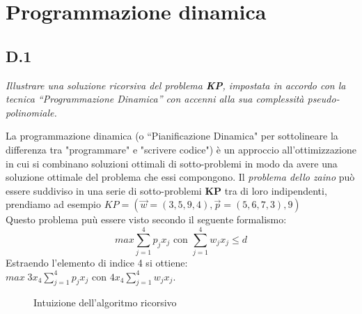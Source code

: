 \documentclass[a4paper]{article}
\begin{document}
\section{Programmazione dinamica}
\subsection{D.1}
\emph{Illustrare una soluzione ricorsiva del problema \textbf{KP}, impostata in accordo con la tecnica “Programmazione Dinamica” con accenni alla sua complessità pseudo-polinomiale.}

La programmazione dinamica (o “Pianificazione Dinamica" per sottolineare la differenza tra "programmare" e "scrivere codice") è un approccio all’ottimizzazione in cui si combinano soluzioni ottimali di sotto-problemi in modo da avere una soluzione ottimale del problema che essi compongono.
Il \textit{problema dello zaino} può essere suddiviso in una serie di sotto-problemi \textbf{KP} tra di loro indipendenti, prendiamo ad esempio $KP = (\vec w = (3,5,9,4), \vec p = (5, 6, 7, 3),9)$\\
Questo problema puù essere visto secondo il seguente formalismo:$$ max \sum_{j=1}^4 p_jx_j \text{ con } \sum_{j=1}^4 w_jx_j \leq d$$
Estraendo l'elemento di indice 4 si ottiene: $ max\; 3x_4 \sum_{j=1}^4 p_jx_j \text{ con } 4x_4\sum_{j=1}^4 w_jx_j$.
\begin{figure}[!ht]
\centering
{}
\caption{Intuizione dell'algoritmo ricorsivo} \label{FIG:D1_intuizione}
\end{figure}\\
\end{document}
